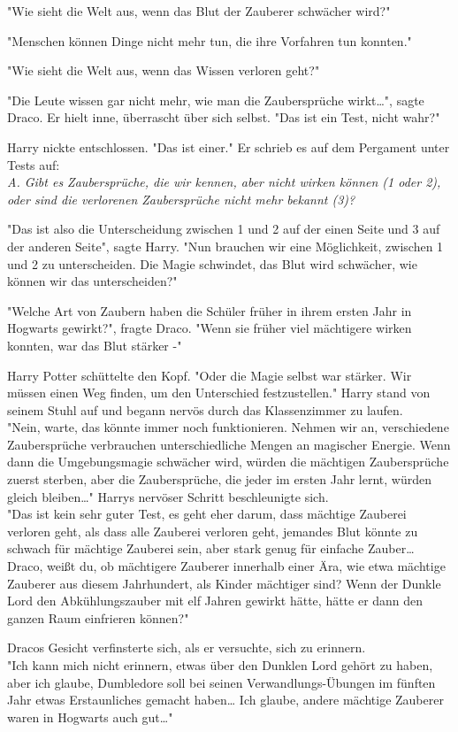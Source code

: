 {"Wie sieht die Welt aus, wenn das Blut der Zauberer schwächer wird?"

"Menschen können Dinge nicht mehr tun, die ihre Vorfahren tun konnten."

"Wie sieht die Welt aus, wenn das Wissen verloren geht?"

"Die Leute wissen gar nicht mehr, wie man die Zaubersprüche wirkt…", sagte Draco. Er hielt inne, überrascht über sich selbst. "Das ist ein Test, nicht wahr?"

Harry nickte entschlossen. "Das ist einer." Er schrieb es auf dem Pergament unter Tests auf:\\ \emph{A. Gibt es Zaubersprüche, die wir kennen, aber nicht wirken können (1 oder 2), oder sind die verlorenen Zaubersprüche nicht mehr bekannt (3)?}

"Das ist also die Unterscheidung zwischen 1 und 2 auf der einen Seite und 3 auf der anderen Seite", sagte Harry. "Nun brauchen wir eine Möglichkeit, zwischen 1 und 2 zu unterscheiden. Die Magie schwindet, das Blut wird schwächer, wie können wir das unterscheiden?"

"Welche Art von Zaubern haben die Schüler früher in ihrem ersten Jahr in Hogwarts gewirkt?", fragte Draco. "Wenn sie früher viel mächtigere wirken konnten, war das Blut stärker -"

Harry Potter schüttelte den Kopf. "Oder die Magie selbst war stärker. Wir müssen einen Weg finden, um den Unterschied festzustellen." Harry stand von seinem Stuhl auf und begann nervös durch das Klassenzimmer zu laufen.\\ "Nein, warte, das könnte immer noch funktionieren. Nehmen wir an, verschiedene Zaubersprüche verbrauchen unterschiedliche Mengen an magischer Energie. Wenn dann die Umgebungsmagie schwächer wird, würden die mächtigen Zaubersprüche zuerst sterben, aber die Zaubersprüche, die jeder im ersten Jahr lernt, würden gleich bleiben…" Harrys nervöser Schritt beschleunigte sich.\\ "Das ist kein sehr guter Test, es geht eher darum, dass mächtige Zauberei verloren geht, als dass alle Zauberei verloren geht, jemandes Blut könnte zu schwach für mächtige Zauberei sein, aber stark genug für einfache Zauber… Draco, weißt du, ob mächtigere Zauberer innerhalb einer Ära, wie etwa mächtige Zauberer aus diesem Jahrhundert, als Kinder mächtiger sind? Wenn der Dunkle Lord den Abkühlungszauber mit elf Jahren gewirkt hätte, hätte er dann den ganzen Raum einfrieren können?"

Dracos Gesicht verfinsterte sich, als er versuchte, sich zu erinnern.\\ "Ich kann mich nicht erinnern, etwas über den Dunklen Lord gehört zu haben, aber ich glaube, Dumbledore soll bei seinen Verwandlungs-Übungen im fünften Jahr etwas Erstaunliches gemacht haben… Ich glaube, andere mächtige Zauberer waren in Hogwarts auch gut…"

}

